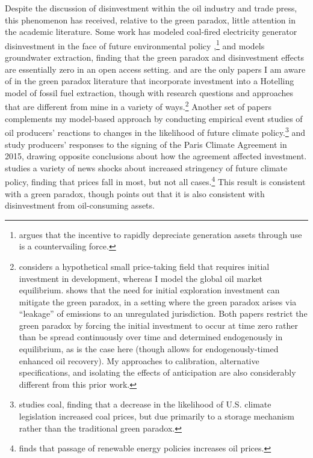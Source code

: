 \documentclass[12pt]{article}
\begin{document}
Despite the discussion of disinvestment within the oil industry and trade press, this phenomenon has received, relative to the green paradox, little attention in the academic literature. Some work has modeled coal-fired electricity generator disinvestment in the face of future environmental policy \citep{lemoine2017,baueretal2018,baldwinetal2020,gowrisankaranlangerzhang2024},\footnote{\cite{mckinley_shortcircuited} argues that the incentive to rapidly depreciate generation assets through use is a countervailing force.} and  \cite{brunohagerty2024} models groundwater extraction, finding that the green paradox and disinvestment effects are essentially zero in an open access setting. \cite{cairnssmith2019} and \cite{kollenbachschopf2022} are the only papers I am aware of in the green paradox literature that incorporate investment into a Hotelling model of fossil fuel extraction, though with research questions and approaches that are different from mine in a variety of ways.\footnote{\cite{cairnssmith2019} considers a hypothetical small price-taking field that requires initial investment in development, whereas I model the global oil market equilibrium. \cite{kollenbachschopf2022} shows that the need for initial exploration investment can mitigate the green paradox, in a setting where the green paradox arises via ``leakage'' of emissions to an unregulated jurisdiction. Both papers restrict the green paradox by forcing the initial investment to occur at time zero rather than be spread continuously over time and determined endogenously in equilibrium, as is the case here (though \cite{cairnssmith2019} allows for endogenously-timed enhanced oil recovery). My approaches to calibration, alternative specifications, and isolating the effects of anticipation are also considerably different from this prior work.} Another set of papers complements my model-based approach by conducting empirical event studies of oil producers' reactions to changes in the likelihood of future climate policy.\footnote{\cite{lemoine2017} studies coal, finding that a decrease in the likelihood of U.S. climate legislation increased coal prices, but due primarily to a storage mechanism rather than the traditional green paradox.} \cite{adolfsenetal2024} and \cite{bogmansetal2023} study producers' responses to the signing of the Paris Climate Agreement in 2015, drawing opposite conclusions about how the agreement affected investment. \cite{normanschlenker2024} studies a variety of news shocks about increased stringency of future climate policy, finding that prices fall in most, but not all cases.\footnote{\cite{normanschlenker2024} finds that passage of renewable energy policies increases oil prices.} This result is consistent with a green paradox, though \cite{lemoine2017} points out that it is also consistent with disinvestment from oil-consuming assets.
\end{document}
